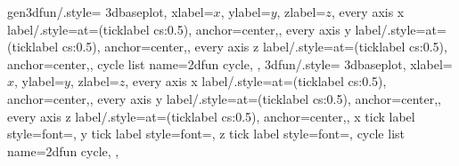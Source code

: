 {  gen3dfun/.style={
    3dbaseplot,
    xlabel={$x$},         
    ylabel={$y$},
    zlabel={$z$},
    every axis x label/.style={at={(ticklabel cs:0.5)}, anchor=center,},
	every axis y label/.style={at={(ticklabel cs:0.5)}, anchor=center,},
	every axis z label/.style={at={(ticklabel cs:0.5)}, anchor=center,},           
    cycle list name=2dfun cycle,
  },
  3dfun/.style={
    3dbaseplot,
    xlabel={$x$},         
    ylabel={$y$},
    zlabel={$z$},           
    every axis x label/.style={at={(ticklabel cs:0.5)}, anchor=center,},
	every axis y label/.style={at={(ticklabel cs:0.5)}, anchor=center,},
	every axis z label/.style={at={(ticklabel cs:0.5)}, anchor=center,},
	x tick label style={font=\tiny}, 
    y tick label style={font=\tiny},
    z tick label style={font=\tiny},
    cycle list name=2dfun cycle,
  },
}
